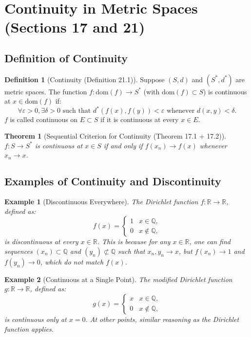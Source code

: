 \documentclass[9pt]{article}
\theoremstyle{definition}
\newtheorem{definition}{Definition}
\theoremstyle{plain}
\newtheorem{theorem}{Theorem}
\newtheorem{example}{Example}
\begin{document}
\section*{Continuity in Metric Spaces (Sections 17 and 21)}

\subsection*{Definition of Continuity}
\begin{definition}[Continuity (Definition 21.1)]
Suppose \( (S, d) \) and \( (S^*, d^*) \) are metric spaces. The function \( f : \text{dom}(f) \to S^* \) (with \( \text{dom}(f) \subset S \)) is continuous at \( x \in \text{dom}(f) \) if:
\[
\forall \varepsilon > 0, \exists \delta > 0 \text{ such that } d^*(f(x), f(y)) < \varepsilon \text{ whenever } d(x, y) < \delta.
\]
\( f \) is called continuous on \( E \subset S \) if it is continuous at every \( x \in E \).
\end{definition}

\begin{theorem}[Sequential Criterion for Continuity (Theorem 17.1 + 17.2)]
\( f : S \to S^* \) is continuous at \( x \in S \) if and only if \( f(x_n) \to f(x) \) whenever \( x_n \to x \).
\end{theorem}

\subsection*{Examples of Continuity and Discontinuity}
\begin{example}[Discontinuous Everywhere]
The Dirichlet function \( f : \mathbb{R} \to \mathbb{R} \), defined as:
\[
f(x) =
\begin{cases}
1 & x \in \mathbb{Q}, \\
0 & x \notin \mathbb{Q},
\end{cases}
\]
is discontinuous at every \( x \in \mathbb{R} \). This is because for any \( x \in \mathbb{R} \), one can find sequences \( (x_n) \subset \mathbb{Q} \) and \( (y_n) \not\subset \mathbb{Q} \) such that \( x_n, y_n \to x \), but \( f(x_n) \to 1 \) and \( f(y_n) \to 0 \), which do not match \( f(x) \).
\end{example}

\begin{example}[Continuous at a Single Point]
The modified Dirichlet function \( g : \mathbb{R} \to \mathbb{R} \), defined as:
\[
g(x) =
\begin{cases}
x & x \in \mathbb{Q}, \\
0 & x \notin \mathbb{Q},
\end{cases}
\]
is continuous only at \( x = 0 \). At other points, similar reasoning as the Dirichlet function applies.
\end{example}
\end{document}
